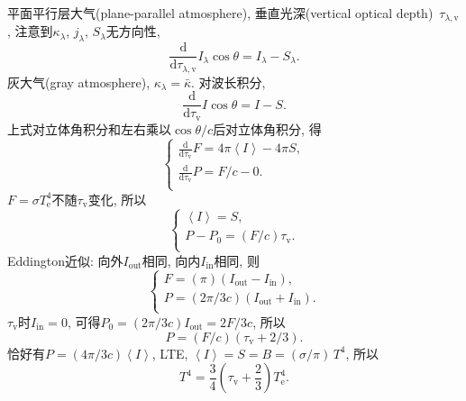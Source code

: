 平面平行层大气(plane-parallel atmosphere), 垂直光深(vertical optical depth)~$\tau_{\lambda,\text{v}}$, 注意到$\kappa_\lambda$, $j_\lambda$, $S_\lambda$无方向性,
\begin{equation*}
    \frac{\mathrm{d}}{\mathrm{d}\tau_{\lambda,\text{v}}}I_\lambda\cos\theta=I_\lambda-S_\lambda.
\end{equation*}
灰大气(gray atmosphere), $\kappa_\lambda=\bar{\kappa}$. 对波长积分,
\begin{equation*}
    \frac{\mathrm{d}}{\mathrm{d}\tau_{\text{v}}}I\cos\theta=I-S.
\end{equation*}
上式对立体角积分和左右乘以$\cos\theta/c$后对立体角积分, 得
\begin{equation*}
    \begin{cases}
        \frac{\mathrm{d}}{\mathrm{d}\tau_{\text{v}}}F=4\pi \left\langle I\right\rangle -4\pi S , \\
        \frac{\mathrm{d}}{\mathrm{d}\tau_{\text{v}}}P=F/c-0 . \\
    \end{cases}
\end{equation*}
$F=\sigma T_\text{e}^4$不随$\tau_{\text{v}}$变化, 所以
\begin{equation*}
    \begin{cases}
        \left\langle I\right\rangle = S , \\
        P-P_0=(F/c)\tau_{\text{v}} . \\
    \end{cases}
\end{equation*}
Eddington近似: 向外$I_\text{out}$相同, 向内$I_\text{in}$相同, 则
\begin{equation*}
    \begin{cases}
        F=(\pi)(I_\text{out}-I_\text{in}) , \\
        P=(2\pi/3c)(I_\text{out}+I_\text{in}) . \\
    \end{cases}
\end{equation*}
$\tau_{\text{v}}$时$I_\text{in}=0$, 可得$P_0=(2\pi/3c)I_\text{out}=2F/3c$, 所以
\begin{equation*}
    P=(F/c)(\tau_{\text{v}}+2/3).
\end{equation*}
恰好有$P=(4\pi/3c)\left\langle I\right\rangle $, LTE, $\left\langle I\right\rangle=S=B=(\sigma/\pi)\,T^4$, 所以
\begin{equation*}
    T^4 = \frac{3}{4}(\tau_{\text{v}}+\frac{2}{3})T_\text{e}^4.
\end{equation*}

